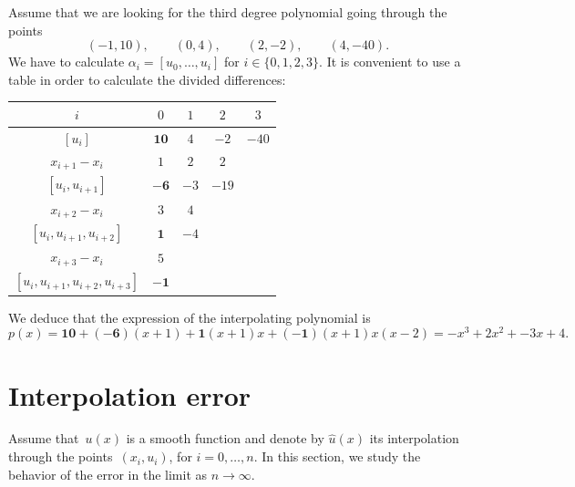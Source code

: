 \begin{example}
    Assume that we are looking for the third degree polynomial going through the points
    \[
        (-1, 10), \qquad (0, 4), \qquad (2, -2), \qquad (4, -40).
    \]
    We have to calculate $\alpha_i = [u_0, \dotsc, u_i]$ for $i \in \{0, 1, 2, 3\}$.
    It is convenient to use a table in order to calculate the divided differences:
    \begin{center}
    \begin{tabular}{|c|c|c|c|c|}
        \hline
        $i$ & $0$ & $1$ & $2$ & $3$ \\ \hline
        $[u_i]$ & $\mathbf{10}$ & $4$ & $-2$ & $-40$ \\ \hline
        $x_{i+1} - x_{i}$ & $1$ & $2$ & $2$ &  \\ \hline
        $[u_i, u_{i+1}]$ & $\mathbf{-6}$ & $-3$ & $-19$ &  \\ \hline
        $x_{i+2} - x_{i}$ & $3$ & $4$ &  &  \\ \hline
        $[u_i, u_{i+1}, u_{i+2}]$ & $\mathbf{1}$ & $-4$ & & \\ \hline
        $x_{i+3} - x_{i}$ & $5$  & &  &  \\ \hline
        $[u_i, u_{i+1}, u_{i+2}, u_{i+3}]$ & $\mathbf{-1}$ & & & \\ \hline
    \end{tabular}
    \end{center}
    We deduce that the expression of the interpolating polynomial is
    \[
        p(x)
        = \mathbf{10} + (\mathbf{-6})(x+1) + \mathbf{1} (x+1)x + (\mathbf{-1}) (x+1)x(x-2)
        = - x^3 + 2 x^2 + -3x + 4.
    \]
\end{example}

\section{Interpolation error}
Assume that~$u(x)$ is a smooth function and denote by $\widehat u(x)$ its interpolation through the points~$(x_i, u_i)$,
for $i = 0, \dotsc, n$.
In this section, we study the behavior of the error in the limit as $n \to \infty$.

